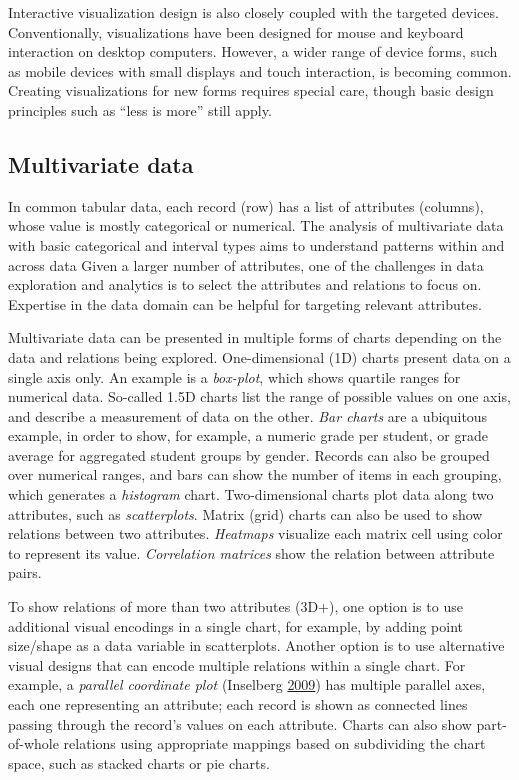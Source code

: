 \documentclass[]{krantz}
\begin{document}
Interactive visualization design is also closely coupled with the
targeted devices. Conventionally, visualizations have been designed for
mouse and keyboard interaction on desktop computers. However, a wider
range of device forms, such as mobile devices with small displays and
touch interaction, is becoming common. Creating visualizations for new
forms requires special care, though basic design principles such as
``less is more'' still apply.

\subsection{Multivariate data}\label{sec:viz-2.1}

In common tabular data, each record (row) has a list of attributes
(columns), whose value is mostly categorical or numerical. The analysis
of multivariate data with basic categorical and interval types aims to
understand patterns within and across data Given a larger number of
attributes, one of the challenges in data exploration and analytics is
to select the attributes and relations to focus on. Expertise in the
data domain can be helpful for targeting relevant attributes.

Multivariate data can be presented in multiple forms of charts depending
on the data and relations being explored. One-dimensional (1D) charts
present data on a single axis only. An example is a \emph{box-plot},
which shows quartile ranges for numerical data. So-called 1.5D charts
list the range of possible values on one axis, and describe a
measurement of data on the other. \emph{Bar charts} are a ubiquitous
example, in order to show, for example, a numeric grade per student, or
grade average for aggregated student groups by gender. Records can also
be grouped over numerical ranges, and bars can show the number of items
in each grouping, which generates a \emph{histogram} chart.
Two-dimensional charts plot data along two attributes, such as
\emph{scatterplots}. Matrix (grid) charts can also be used to show
relations between two attributes. \emph{Heatmaps} visualize each matrix
cell using color to represent its value. \emph{Correlation matrices}
show the relation between attribute pairs.

To show relations of more than two attributes (3D+), one option is to
use additional visual encodings in a single chart, for example, by
adding point size/shape as a data variable in scatterplots. Another
option is to use alternative visual designs that can encode multiple
relations within a single chart. For example, a \emph{parallel
coordinate plot} (Inselberg \protect\hyperlink{ref-inselberg2009}{2009})
has multiple parallel axes, each one representing an attribute; each
record is shown as connected lines passing through the record's values
on each attribute. Charts can also show part-of-whole relations using
appropriate mappings based on subdividing the chart space, such as
stacked charts or pie charts.
\end{document}
